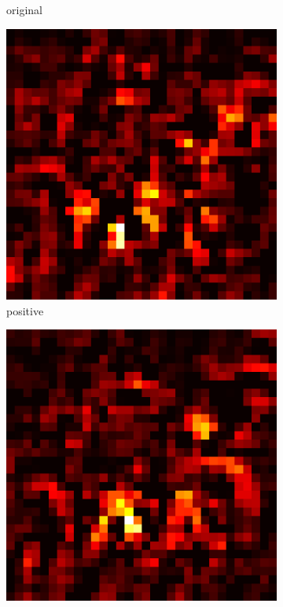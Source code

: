 \documentclass[preprint,12pt]{elsarticle}
\begin{document}
\begin{figure}
\begin{subfigure}{0.14\linewidth}
        \caption{original}
    \end{subfigure}
    \hfill
    \begin{subfigure}{0.14\textwidth}
        \centering
        \includegraphics[width=\linewidth]{../visualizations/examples/cifar10/cnn/positive_saliency_map/9.png}
        \caption{positive}
    \end{subfigure}
    \hfill
    \begin{subfigure}{0.14\textwidth}
        \centering
        \includegraphics[width=\linewidth]{../visualizations/examples/cifar10/cnn/negative_saliency_map/9.png}

\end{subfigure}
\end{figure}
\end{document}
